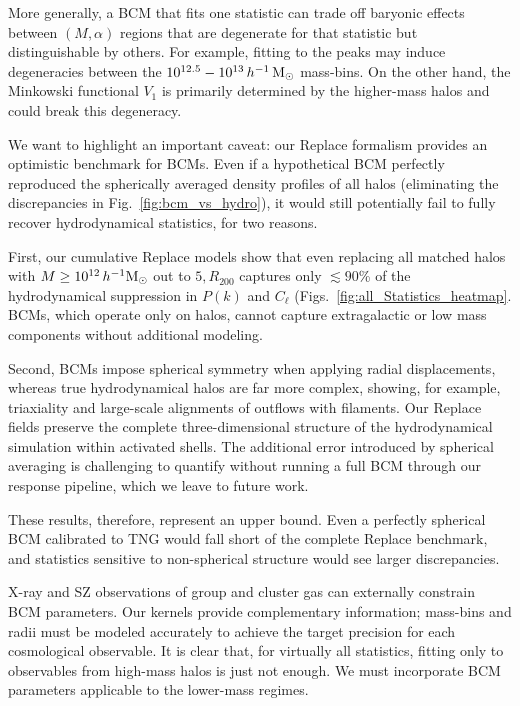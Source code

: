 \documentclass[linenumbers,trackchanges]{aastex701}
\begin{document}
More generally, a BCM that fits one statistic can trade off baryonic effects between $(M,\alpha)$ regions that are degenerate for that statistic but distinguishable by others. For example, fitting to the peaks may induce degeneracies between the $10^{12.5} - 10^{13}\,h^{-1}\,{\rm M}_\odot$ mass-bins. On the other hand, the Minkowski functional $V_1$ is primarily determined by the higher-mass halos and could break this degeneracy.

We want to highlight an important caveat: our Replace formalism provides an optimistic benchmark for BCMs. Even if a hypothetical BCM perfectly reproduced the spherically averaged density profiles of all halos (eliminating the discrepancies in Fig.~\ref{fig:bcm_vs_hydro}), it would still potentially fail to fully recover hydrodynamical statistics, for two reasons.

First, our cumulative Replace models show that even replacing all matched halos with $M \geq 10^{12}\,h^{-1}{\rm M}_\odot$ out to $5,R_{200}$ captures only $\lesssim 90$\% of the hydrodynamical suppression in $P(k)$ and $C_\ell$ (Figs.~\ref{fig:all_Statistics_heatmap}. BCMs, which operate only on halos, cannot capture extragalactic or low mass components without additional modeling.

Second, BCMs impose spherical symmetry when applying radial displacements, whereas true hydrodynamical halos are far more complex, showing, for example, triaxiality and large-scale alignments of outflows with filaments. Our Replace fields preserve the complete three-dimensional structure of the hydrodynamical simulation within activated shells. The additional error introduced by spherical averaging is challenging to quantify without running a full BCM through our response pipeline, which we leave to future work.

These results, therefore, represent an upper bound. Even a perfectly spherical BCM calibrated to TNG would fall short of the complete Replace benchmark, and statistics sensitive to non-spherical structure would see larger discrepancies.

X-ray and SZ observations of group and cluster gas can externally constrain BCM parameters. Our kernels provide complementary information; mass-bins and radii must be modeled accurately to achieve the target precision for each cosmological observable. It is clear that, for virtually all statistics, fitting only to observables from high-mass halos is just not enough. We must incorporate BCM parameters applicable to the lower-mass regimes.
\end{document}
